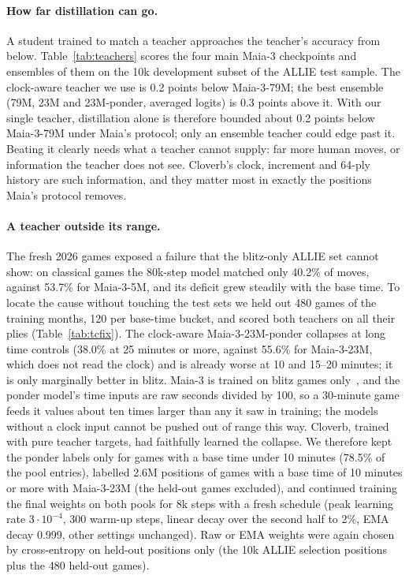 \paragraph{How far distillation can go.} A student trained to match a teacher approaches the
teacher's accuracy from below. Table~\ref{tab:teachers} scores the four main Maia-3 checkpoints and
ensembles of them on the 10k development subset of the ALLIE test sample. The clock-aware teacher we
use is 0.2 points below Maia-3-79M; the best ensemble (79M, 23M and 23M-ponder, averaged logits) is
0.3 points above it. With our single teacher, distillation alone is therefore bounded about 0.2
points below Maia-3-79M under Maia's protocol; only an ensemble teacher could edge past it.
Beating it clearly needs what a teacher cannot supply: far more human moves, or information the
teacher does not see. Cloverb's clock, increment and 64-ply history are such information, and they
matter most in exactly the positions Maia's protocol removes.

\paragraph{A teacher outside its range.} The fresh 2026 games exposed a failure that the blitz-only
ALLIE set cannot show: on classical games the 80k-step model matched only 40.2\% of moves, against
53.7\% for Maia-3-5M, and its deficit grew steadily with the base time. To locate the cause without
touching the test sets we held out 480 games of the training months, 120 per base-time bucket, and
scored both teachers on all their plies (Table~\ref{tab:tcfix}). The clock-aware Maia-3-23M-ponder
collapses at long time controls (38.0\% at 25 minutes or more, against 55.6\% for Maia-3-23M, which
does not read the clock) and is already worse at 10 and 15--20 minutes; it is only marginally better in
blitz. Maia-3 is trained on blitz games only~\cite{chessformer}, and the ponder model's time inputs are
raw seconds divided by 100, so a 30-minute game feeds it values about ten times larger than any it saw
in training; the models without a clock input cannot be pushed out of range this way. Cloverb, trained
with pure teacher targets, had faithfully learned the collapse. We therefore kept the ponder labels only for games with
a base time under 10 minutes (78.5\% of the pool entries), labelled 2.6M positions of games with a base
time of 10 minutes or more with Maia-3-23M (the held-out games excluded), and continued training the
final weights on both pools for 8k steps with a fresh schedule (peak learning rate $3\cdot10^{-4}$,
300 warm-up steps, linear decay over the second half to 2\%, EMA decay 0.999, other settings
unchanged). Raw or EMA weights were again chosen by cross-entropy on held-out positions only (the
10k ALLIE selection positions plus the 480 held-out games).

